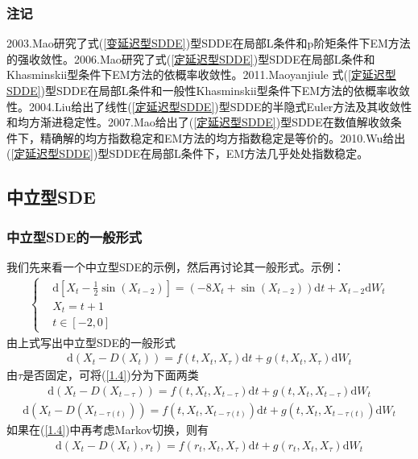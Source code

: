         \subsubsection{注记}
            2003.Mao\cite{2003.Mao}研究了式(\ref{变延迟型SDDE})型SDDE在局部L条件和p阶矩条件下EM方法的强收敛性。2006.Mao\cite{2006.Mao}研究了式(\ref{定延迟型SDDE})型SDDE在局部L条件和Khasminskii型条件下EM方法的依概率收敛性。2011.Mao\cite{2011.Mao}yanjiule 式(\ref{定延迟型SDDE})型SDDE在局部L条件和一般性Khasminskii型条件下EM方法的依概率收敛性。2004.Liu\cite{2004.Liu}给出了线性(\ref{定延迟型SDDE})型SDDE的半隐式Euler方法及其收敛性和均方渐进稳定性。2007.Mao\cite{2007.Mao}给出了(\ref{定延迟型SDDE})型SDDE在数值解收敛条件下，精确解的均方指数稳定和EM方法的均方指数稳定是等价的。2010.Wu\cite{2010.Wu}给出(\ref{定延迟型SDDE})型SDDE在局部L条件下，EM方法几乎处处指数稳定。

    \subsection{中立型SDE}
        \subsubsection{中立型SDE的一般形式}
            \par
            我们先来看一个中立型SDE的示例，然后再讨论其一般形式。示例：
            \begin{align*}
                \left\{
                    \begin{aligned}
                     &\mathrm{d}[X_t - \frac 12 \sin(X_{t-2})] = (-8X_t + \sin(X_{t-2}) )\mathrm{d}t + X_{t-2}\mathrm{d}W_t\\
                    &X_t = t+1\\
                    &t\in[-2,0]
                    \end{aligned}
                \right.
            \end{align*}
            由上式写出中立型SDE的一般形式
            \begin{align}\label{1.4}
                \mathrm{d}(X_t - D(X_t)) = f(t,X_t,X_\tau)\mathrm{d}t + g(t,X_t,X_\tau)\mathrm{d}W_t
            \end{align}
            由$\tau$是否固定，可将(\ref{1.4})分为下面两类
            \begin{align}\label{1.5}
                \mathrm{d}(X_t - D(X_{t-\tau})) = f(t,X_t,X_{t-\tau})\mathrm{d}t + g(t,X_t,X_{t-\tau})\mathrm{d}W_t
            \end{align}
            \begin{align}\label{1.6}
                \mathrm{d}\left(X_t - D\left(X_{t-\tau(t)}\right)\right) = f\left(t,X_t,X_{t-\tau(t)}\right)\mathrm{d}t + g\left(t,X_t,X_{t-\tau(t)}\right)\mathrm{d}W_t
            \end{align}
            如果在(\ref{1.4})中再考虑Markov切换，则有
            \begin{align}\label{1.7}
                \mathrm{d}(X_t - D(X_t),r_t) = f(r_t,X_t,X_\tau)\mathrm{d}t + g(r_t,X_t,X_\tau)\mathrm{d}W_t
            \end{align}

